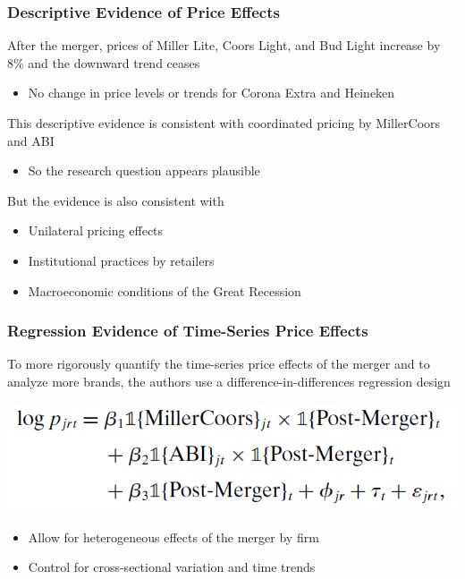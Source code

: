 \documentclass{beamer}
\begin{document}
\begin{frame}\frametitle{Descriptive Evidence of Price Effects}
    After the merger, prices of Miller Lite, Coors Light, and Bud Light increase by 8\% and the downward trend ceases
    \begin{itemize}
        \item No change in price levels or trends for Corona Extra and Heineken
    \end{itemize}
    \vspace{3ex}
    This descriptive evidence is consistent with coordinated pricing by MillerCoors and ABI
    \begin{itemize}
        \item So the research question appears plausible
    \end{itemize}
    \vspace{3ex}
    But the evidence is also consistent with
    \begin{itemize}
        \item Unilateral pricing effects
        \item Institutional practices by retailers
        \item Macroeconomic conditions of the Great Recession
    \end{itemize}
\end{frame}

\begin{frame}\frametitle{Regression Evidence of Time-Series Price Effects}
    To more rigorously quantify the time-series price effects of the merger and to analyze more brands, the authors use a difference-in-differences regression design
    \vspace{2ex}
    \begin{center}
        \includegraphics[width=0.5\linewidth]{eq_1}
    \end{center}
    \begin{itemize}
        \item Allow for heterogeneous effects of the merger by firm
        \item Control for cross-sectional variation and time trends
    \end{itemize}
\end{frame}
\end{document}

